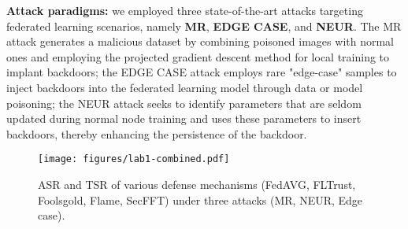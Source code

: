 \documentclass[lettersize,journal]{IEEEtran}
\begin{document}
\textbf{Attack paradigms:} we employed three state-of-the-art attacks targeting federated learning scenarios, namely \textbf{MR}\cite{MR}, \textbf{EDGE CASE}\cite{EDGE_CASE}, and \textbf{NEUR}\cite{zhang2022neurotoxin}. The MR attack generates a malicious dataset by combining poisoned images with normal ones and employing the projected gradient descent method for local training to implant backdoors; the EDGE CASE attack employs rare "edge-case" samples to inject backdoors into the federated learning model through data or model poisoning; the NEUR attack seeks to identify parameters that are seldom updated during normal node training and uses these parameters to insert backdoors, thereby enhancing the persistence of the backdoor.

\begin{figure*}[!ht]
    \centering
    \texttt{[image: figures/lab1-combined.pdf]}
    \caption{ASR and TSR of various defense mechanisms (FedAVG, FLTrust, Foolsgold, Flame, SecFFT) under three attacks (MR, NEUR, Edge case).}
    \label{fig:lab1}
\end{figure*}
\end{document}
